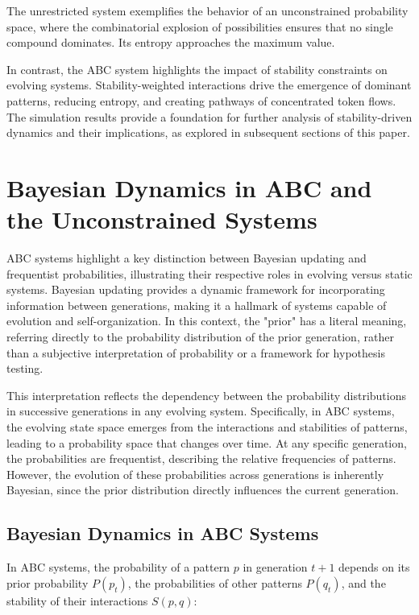 \documentclass[entropy,article,submit,pdftex,oneauthor]{Definitions/mdpi}
\begin{document}
The unrestricted system exemplifies the behavior of an unconstrained probability space, where the combinatorial explosion of possibilities ensures that no single compound dominates. Its entropy approaches the maximum value.

In contrast, the ABC system highlights the impact of stability constraints on evolving systems. Stability-weighted interactions drive the emergence of dominant patterns, reducing entropy, and creating pathways of concentrated token flows. The simulation results provide a foundation for further analysis of stability-driven dynamics and their implications, as explored in subsequent sections of this paper.

\section{Bayesian Dynamics in ABC and the Unconstrained Systems}

ABC systems highlight a key distinction between Bayesian \cite{mcgrayne2011theory} updating and frequentist probabilities, illustrating their respective roles in evolving versus static systems. Bayesian updating provides a dynamic framework for incorporating information between generations, making it a hallmark of systems capable of evolution and self-organization. In this context, the "prior" has a literal meaning, referring directly to the probability distribution of the prior generation, rather than a subjective interpretation of probability or a framework for hypothesis testing.

This interpretation reflects the dependency between the probability distributions in successive generations in any evolving system. Specifically, in ABC systems, the evolving state space emerges from the interactions and stabilities of patterns, leading to a probability space that changes over time. At any specific generation, the probabilities are frequentist, describing the relative frequencies of patterns. However, the evolution of these probabilities across generations is inherently Bayesian, since the prior distribution directly influences the current generation.

\subsection{Bayesian Dynamics in ABC Systems}

In ABC systems, the probability of a pattern \( p \) in generation \( t+1 \) depends on its prior probability \( P(p_t) \), the probabilities of other patterns \( P(q_t) \), and the stability of their interactions \( S(p, q) \):
\end{document}
